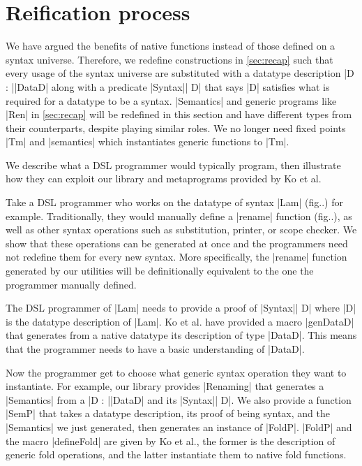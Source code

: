 \documentclass[sigplan,review,fleqn]{acmart}
\renewcommand{\verb}{\collectverb{\color{AgdaFunction}}}
\newcommand{\macro}{\collectverb{\color{AgdaMacro}}}
\newcommand{\name}{\collectverb{\color{AgdaSymbol}}}
\begin{document}
\section{Reification process}
We have argued the benefits of native functions instead of those defined on a syntax universe.
Therefore, we redefine constructions in \cref{sec:recap} such that every usage of the syntax universe are substituted with a datatype description \name|D : |\verb|DataD| along with a predicate \verb|Syntax|\name| D| that says \name|D| satisfies what is required for a datatype to be a syntax.
\verb|Semantics| and generic programs like \verb|Ren| in \cref{sec:recap} will be redefined in this section and have different types from their counterparts, despite playing similar roles.
We no longer need fixed points \verb|Tm| and \verb|semantics| which instantiates generic functions to \verb|Tm|.

We describe what a DSL programmer would typically program, then illustrate how they can exploit our library and metaprograms provided by Ko et al.

Take a DSL programmer who works on the datatype of syntax \verb|Lam| (fig..) for example.
Traditionally, they would manually define a \verb|rename| function (fig..), as well as other syntax operations such as substitution, printer, or scope checker.
We show that these operations can be generated at once and the programmers need not redefine them for every new syntax.
More specifically, the \verb|rename| function generated by our utilities will be definitionally equivalent to the one the programmer manually defined.

The DSL programmer of \verb|Lam| needs to provide a proof of \verb|Syntax|\name| D| where \name|D| is the datatype description of \verb|Lam|. 
Ko et al. have provided a macro \macro|genDataD| that generates from a native datatype its description of type \verb|DataD|.
This means that the programmer needs to have a basic understanding of \verb|DataD|. 

Now the programmer get to choose what generic syntax operation they want to instantiate.
For example, our library provides \verb|Renaming| that generates a \verb|Semantics| from a \name|D : |\verb|DataD| and its \verb|Syntax|\name| D|. 
We also provide a function \verb|SemP| that takes a datatype description, its proof of being syntax, and the \verb|Semantics| we just generated, then generates an instance of \verb|FoldP|.
\verb|FoldP| and the macro \macro|defineFold| are given by Ko et al., the former is the description of generic fold operations, and the latter instantiate them to native fold functions.
\end{document}
